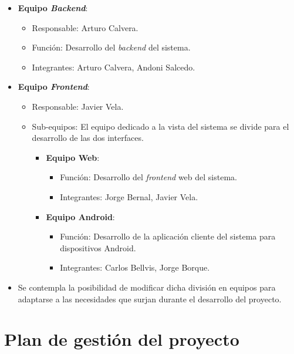 \documentclass{article}
\begin{document}
\begin{itemize}
    \setlength{\itemsep}{0em}
    \item \textbf{Equipo \textit{Backend}}:
    \begin{itemize}
        \setlength{\itemsep}{0em}
        \item Responsable: Arturo Calvera.
        \item Función: Desarrollo del \textit{backend} del sistema.
        \item Integrantes: Arturo Calvera, Andoni Salcedo.
    \end{itemize}
    \item \textbf{Equipo \textit{Frontend}}:
    \begin{itemize}
        \setlength{\itemsep}{0em}
        \item Responsable: Javier Vela.
        \item Sub-equipos: El equipo dedicado a la vista del sistema se divide para el desarrollo de las dos interfaces.
        \begin{itemize}
            \setlength{\itemsep}{0em}
            \item \textbf{Equipo Web}:
            \begin{itemize}
                \setlength{\itemsep}{0em}
                \item Función: Desarrollo del \textit{frontend} web del sistema.
                \item Integrantes: Jorge Bernal, Javier Vela.
            \end{itemize}
        \item \textbf{Equipo Android}:
            \begin{itemize}
                \setlength{\itemsep}{0em}
                \item Función: Desarrollo de la aplicación cliente del sistema para dispositivos Android.
                \item Integrantes: Carlos Bellvis, Jorge Borque.
            \end{itemize}
        \end{itemize}
    \end{itemize}
    \item Se contempla la posibilidad de modificar dicha división en equipos para adaptarse a las necesidades que surjan durante el desarrollo del proyecto.
\end{itemize}

\section{Plan de gestión del proyecto}
\end{document}

